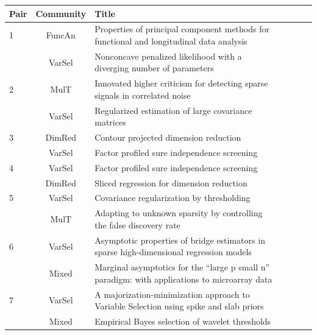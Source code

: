 \documentclass[AMS,STIX1COL]{WileyNJD-v2}
\begin{document}
{%

\begin{table}[htbp]
\centering
\begin{tabular}{lclclcl}\hline
Pair & Community & Title & \\
\hline
1    & FuncAn    & Properties of principal component methods for functional and longitudinal data analysis       & \\
     & VarSel    & Nonconcave penalized likelihood with a diverging number of parameters                         & \\
2    & MulT      & Innovated higher criticism for detecting sparse signals in correlated noise                   & \\
     & VarSel    & Regularized estimation of large covariance matrices & \\
3    & DimRed    & Contour projected dimension reduction & \\
     & VarSel    & Factor profiled sure independence screening & \\
4    & VarSel    & Factor profiled sure independence screening & \\
     & DimRed    & Sliced regression for dimension reduction & \\
5    & VarSel    & Covariance regularization by thresholding & \\
     & MulT      & Adapting to unknown sparsity by controlling the false discovery rate                          & \\
6    & VarSel    & Asymptotic properties of bridge estimators in sparse high-dimensional regression models       & \\
     & Mixed     & Marginal asymptotics for the ``large p small n'' paradigm: with applications to microarray data &  \\
7    & VarSel    & A majorization-minimization approach to Variable Selection using spike and slab priors        & \\
     & Mixed     & Empirical Bayes selection of wavelet thresholds & \\

\end{tabular}
\end{table}}
\end{document}
